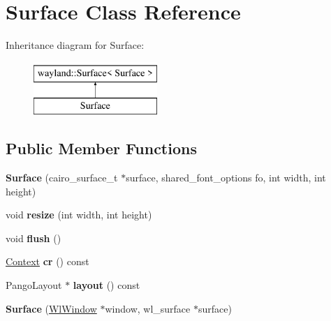 \hypertarget{classSurface}{}\section{Surface Class Reference}
\label{classSurface}
Inheritance diagram for Surface\+:\begin{figure}[H]
\begin{center}
\leavevmode
\includegraphics[height=2.000000cm]{classSurface}
\end{center}
\end{figure}
\subsection*{Public Member Functions}
\begin{DoxyCompactItemize}
\item 
\mbox{\label{classSurface_a6f8c7dd7ef8d6146a86bb764e0cd3e3f}} 
{\bfseries Surface} (cairo\+\_\+surface\+\_\+t $\ast$surface, shared\+\_\+font\+\_\+options fo, int width, int height)
\item 
\mbox{\label{classSurface_a4ba8d2cdfc77c55d79e91219cc84ba5f}} 
void {\bfseries resize} (int width, int height)
\item 
\mbox{\label{classSurface_a272d57700514374c6a1f8c8fa0664267}} 
void {\bfseries flush} ()
\item 
\mbox{\label{classSurface_a015f6657894e26b88315b9dc7171f2fb}} 
\mbox{\hyperlink{classContext}{Context}} {\bfseries cr} () const
\item 
\mbox{\label{classSurface_ae0086b14eb72e1ff4f2ff5d9323c1a7d}} 
Pango\+Layout $\ast$ {\bfseries layout} () const
\item 
\mbox{\label{classSurface_a70a3d4f756f986a90a2e2785e199b610}} 
{\bfseries Surface} (\mbox{\hyperlink{classWlWindow}{Wl\+Window}} $\ast$window, wl\+\_\+surface $\ast$surface)
\end{DoxyCompactItemize}
